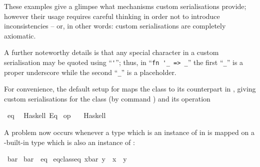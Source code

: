 \begin{isabellebody}
\begin{isamarkuptext}
  These examples give a glimpse what mechanisms
  custom serialisations provide; however their usage
  requires careful thinking in order not to introduce
  inconsistencies -- or, in other words:
  custom serialisations are completely axiomatic.

  A further noteworthy details is that any special
  character in a custom serialisation may be quoted
  using ``\verb|'|''; thus, in
  ``\verb|fn '_ => _|'' the first
  ``\verb|_|'' is a proper underscore while the
  second ``\verb|_|'' is a placeholder.%
\end{isamarkuptext}%
\isamarkuptrue%
%
\isamarkuptrue%
%
\begin{isamarkuptext}%
For convenience, the default
   setup for  maps the  class to
  its counterpart in , giving custom serialisations
  for the class  (by command \hyperlink{command.code-class}{\mbox{}}) and its operation
\end{isamarkuptext}%
\isamarkuptrue%
%
\isadelimquotett
%
\endisadelimquotett
%
\isatagquotett
{}\isamarkupfalse%
\ eq\isanewline
\ \ {\isacharparenleft}Haskell\ {\isachardoublequoteopen}Eq{\isachardoublequoteclose}{\isacharparenright}\isanewline
\isanewline
{}\isamarkupfalse%
\ {\isachardoublequoteopen}op\ {\isacharequal}{\isachardoublequoteclose}\isanewline
\ \ {\isacharparenleft}Haskell\ \ {}\ {\isachardoublequoteopen}{\isacharequal}{\isacharequal}{\isachardoublequoteclose}{\isacharparenright}%
\endisatagquotett
{\isafoldquotett}%
%
\isadelimquotett
%
\endisadelimquotett
%
\begin{isamarkuptext}%
\noindent A problem now occurs whenever a type which
  is an instance of  in  is mapped
  on a -built-in type which is also an instance
  of  :%
\end{isamarkuptext}%
\isamarkuptrue%
%
\isadelimquote
%
\endisadelimquote
%
\isatagquote
{}\isamarkupfalse%
\ bar\isanewline
\isanewline
{}\isamarkupfalse%
\ bar\ {\isacharcolon}{\isacharcolon}\ eq\isanewline
{}\isanewline
\isanewline
{}\isamarkupfalse%
\ {\isachardoublequoteopen}eq{\isacharunderscore}class{\isachardot}eq\ {\isacharparenleft}x{\isasymColon}bar{\isacharparenright}\ y\ {\isasymlongleftrightarrow}\ x\ {\isacharequal}\ y{\isachardoublequoteclose}\isanewline

\end{isabellebody}
